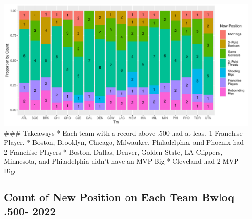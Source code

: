 \documentclass[
]{article}
\begin{document}
\includegraphics{Reclassifying-NBA-Player-Postions-Pt.-3---Clustering-Analysis-Results_files/figure-latex/unnamed-chunk-15-1.pdf}
\#\#\# Takeaways * Each team with a record above .500 had at least 1
Franchise Player. * Boston, Brooklyn, Chicago, Milwaukee, Philadelphia,
and Phoenix had 2 Franchise Players * Boston, Dallas, Denver, Golden
State, LA Clippers, Minnesota, and Philadelphia didn't have an MVP Big *
Cleveland had 2 MVP Bigs

\hypertarget{count-of-new-position-on-each-team-bwloq-.500--2022}{%
\subsection{Count of New Position on Each Team Bwloq .500-
2022}\label{count-of-new-position-on-each-team-bwloq-.500--2022}}
\end{document}
